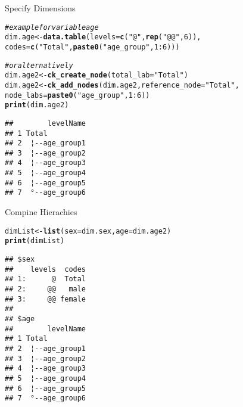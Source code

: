 \documentclass{beamer}\usepackage[]{graphicx}\usepackage[]{color}
\makeatletter
\newcommand{\hlnum}[1]{\textcolor[rgb]{0.686,0.059,0.569}{#1}}%
\newcommand{\hlstr}[1]{\textcolor[rgb]{0.192,0.494,0.8}{#1}}%
\newcommand{\hlcom}[1]{\textcolor[rgb]{0.678,0.584,0.686}{\textit{#1}}}%
\newcommand{\hlopt}[1]{\textcolor[rgb]{0,0,0}{#1}}%
\newcommand{\hlstd}[1]{\textcolor[rgb]{0.345,0.345,0.345}{#1}}%
\newcommand{\hlkwb}[1]{\textcolor[rgb]{0.69,0.353,0.396}{#1}}%
\newcommand{\hlkwc}[1]{\textcolor[rgb]{0.333,0.667,0.333}{#1}}%
\newcommand{\hlkwd}[1]{\textcolor[rgb]{0.737,0.353,0.396}{\textbf{#1}}}%
\newenvironment{kframe}{%
 \def\at@end@of@kframe{}%
 \ifinner\ifhmode%
  \def\at@end@of@kframe{\end{minipage}}%
  \begin{minipage}{\columnwidth}%
 \fi\fi%
 \def\FrameCommand##1{\hskip\@totalleftmargin \hskip-\fboxsep
 \colorbox{shadecolor}{##1}\hskip-\fboxsep
     \hskip-\linewidth \hskip-\@totalleftmargin \hskip\columnwidth}%
 \MakeFramed {\advance\hsize-\width
   \@totalleftmargin\z@ \linewidth\hsize
   \@setminipage}}%
 {\par\unskip\endMakeFramed%
 \at@end@of@kframe}
\newenvironment{knitrout}{}{} %
\makeatother
\begin{document}
\begin{frame}[fragile]{Specify Dimensions}

\begin{knitrout}\footnotesize
{}\color{fgcolor}\begin{kframe}
\begin{alltt}
\hlcom{# example for variable age}
\hlstd{dim.age} \hlkwb{<-} \hlkwd{data.table}\hlstd{(}\hlkwc{levels}\hlstd{=}\hlkwd{c}\hlstd{(}\hlstr{"@"}\hlstd{,}\hlkwd{rep}\hlstd{(}\hlstr{"@@"}\hlstd{,} \hlnum{6}\hlstd{)),}
                      \hlkwc{codes}\hlstd{=}\hlkwd{c}\hlstd{(}\hlstr{"Total"}\hlstd{,} \hlkwd{paste0}\hlstd{(}\hlstr{"age_group"}\hlstd{,}\hlnum{1}\hlopt{:}\hlnum{6}\hlstd{)))}

\hlcom{# or alternatively}
\hlstd{dim.age2} \hlkwb{<-} \hlkwd{ck_create_node}\hlstd{(}\hlkwc{total_lab}\hlstd{=}\hlstr{"Total"}\hlstd{)}
\hlstd{dim.age2} \hlkwb{<-} \hlkwd{ck_add_nodes}\hlstd{(dim.age2,} \hlkwc{reference_node}\hlstd{=}\hlstr{"Total"}\hlstd{,}
                         \hlkwc{node_labs}\hlstd{=}\hlkwd{paste0}\hlstd{(}\hlstr{"age_group"}\hlstd{,}\hlnum{1}\hlopt{:}\hlnum{6}\hlstd{))}
\hlkwd{print}\hlstd{(dim.age2)}
\end{alltt}
\begin{verbatim}
##        levelName
## 1 Total         
## 2  ¦--age_group1
## 3  ¦--age_group2
## 4  ¦--age_group3
## 5  ¦--age_group4
## 6  ¦--age_group5
## 7  °--age_group6
\end{verbatim}
\end{kframe}
\end{knitrout}
\end{frame}

\begin{frame}[fragile]{Compine Hierachies}
\begin{knitrout}\footnotesize
{}\color{fgcolor}\begin{kframe}
\begin{alltt}
\hlstd{dimList} \hlkwb{<-} \hlkwd{list}\hlstd{(}\hlkwc{sex}\hlstd{=dim.sex,} \hlkwc{age}\hlstd{=dim.age2)}
\hlkwd{print}\hlstd{(dimList)}
\end{alltt}
\begin{verbatim}
## $sex
##    levels  codes
## 1:      @  Total
## 2:     @@   male
## 3:     @@ female
## 
## $age
##        levelName
## 1 Total         
## 2  ¦--age_group1
## 3  ¦--age_group2
## 4  ¦--age_group3
## 5  ¦--age_group4
## 6  ¦--age_group5
## 7  °--age_group6
\end{verbatim}
\end{kframe}
\end{knitrout}
\end{frame}
\end{document}
